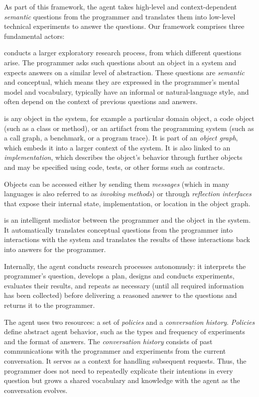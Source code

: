 As part of this framework, the agent takes high-level and context-dependent \emph{semantic} questions from the programmer and translates them into low-level technical experiments to answer the questions.
Our framework comprises three fundamental actors:

\begin{description}[noextralabelsep]
	\item[The programmer] conducts a larger exploratory research process, from which different questions arise.
	The programmer asks such questions about an object in a system and expects answers on a similar level of abstraction.
	These questions are \emph{semantic} and conceptual, which means they are expressed in the programmer's mental model and vocabulary, typically have an informal or natural-language style, and often depend on the context of previous questions and answers.

	\item[The object] is any object in the system, for example a particular domain object, a code object (such as a class or method), or an artifact from the programming system (such as a call graph, a benchmark, or a program trace).
	It is part of an \emph{object graph}, which embeds it into a larger context of the system.
	It is also linked to an \emph{implementation}, which describes the object's behavior through further objects and may be specified using code, tests, or other forms such as contracts.

	Objects can be accessed either by sending them \emph{messages} (which in many languages is also referred to as \emph{invoking methods}) or through \emph{reflection interfaces} that expose their internal state, implementation, or location in the object graph.

	\item[The exploratory programming agent] is an intelligent mediator between the programmer and the object in the system.
	It automatically translates conceptual questions from the programmer into interactions with the system and translates the results of these interactions back into answers for the programmer.

	Internally, the agent conducts research processes autonomusly: it interprets the programmer's question, develops a plan, designs and conducts experiments, evaluates their results, and repeats as necessary (until all required information has been collected) before delivering a reasoned answer to the questions and returns it to the programmer.

	The agent uses two resources: a set of \emph{policies} and a \emph{conversation history}.
	\emph{Policies} define abstract agent behavior, such as the types and frequency of experiments and the format of answers.
	The \emph{conversation history} consists of past communications with the programmer and experiments from the current conversation.
	It serves as a context for handling subsequent requests.
	Thus, the programmer does not need to repeatedly explicate their intentions in every question but grows a shared vocabulary and knowledge with the agent as the conversation evolves.
\end{description}

